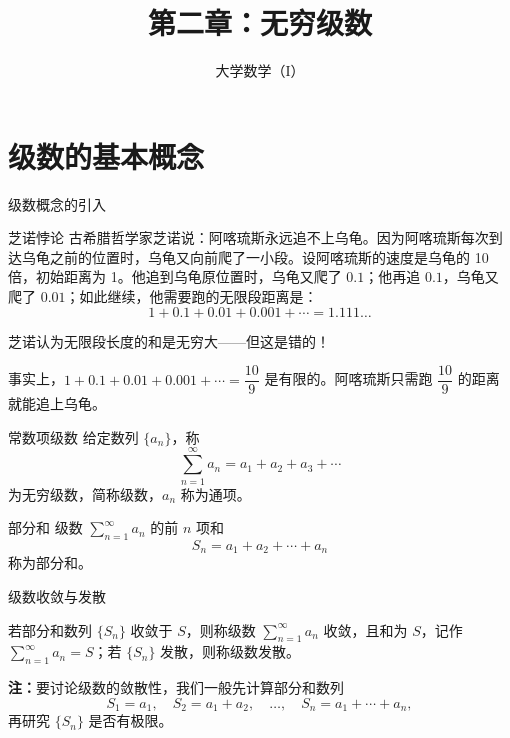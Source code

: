 \documentclass[aspectratio=169,10pt]{ctexbeamer}
\title[第二章：无穷级数]{第二章：无穷级数}
\author[大学数学（I）]{大学数学（I）}
\begin{document}
\begin{frame}[plain]
  \titlepage
\end{frame}






\section{级数的基本概念}



\begin{frame}{级数概念的引入}
	
	\begin{block}{芝诺悖论}
		古希腊哲学家芝诺说：阿喀琉斯永远追不上乌龟。因为阿喀琉斯每次到达乌龟之前的位置时，乌龟又向前爬了一小段。设阿喀琉斯的速度是乌龟的 10 倍，初始距离为 1。他追到乌龟原位置时，乌龟又爬了 \(0.1\)；他再追 \(0.1\)，乌龟又爬了 \(0.01\)；如此继续，他需要跑的无限段距离是：
		\[
		1 + 0.1 + 0.01 + 0.001 + \cdots = 1.111\ldots
		\]
		\vspace{0.5cm}
		
		芝诺认为无限段长度的和是无穷大——但这是错的！
		\vspace{0.5cm}
		
		事实上，\(1 + 0.1 + 0.01 + 0.001 + \cdots = \dfrac{10}{9}\) 是有限的。阿喀琉斯只需跑 \(\dfrac{10}{9}\) 的距离就能追上乌龟。
	\end{block}

\end{frame}

\begin{frame}
	\begin{block}{常数项级数}
		给定数列 \(\{a_n\}\)，称
		\[
		\sum_{n=1}^{\infty} a_n = a_1 + a_2 + a_3 + \cdots
		\]
		为无穷级数，简称级数，\(a_n\) 称为通项。
	\end{block}
	\vspace{0.8cm}
	\begin{block}{部分和}
		级数 \(\sum\limits_{n = 1}^{  \infty }  a_n\) 的前 \(n\) 项和
		\[
		S_n = a_1 + a_2 + \cdots + a_n
		\]
		称为部分和。
	\end{block}
	
\end{frame}

\begin{frame}{级数收敛与发散}
	\begin{block}{}
		若部分和数列 \(\{S_n\}\) 收敛于 \(S\)，则称级数 \(\sum\limits_{n = 1}^{  \infty } a_n\) 收敛，且和为 \(S\)，记作 \(\sum\limits_{n = 1}^{  \infty } a_n = S\)；若 \(\{S_n\}\) 发散，则称级数发散。
	\end{block}
	
	\vspace{0.8cm}
	\textbf{注：}要讨论级数的敛散性，我们一般先计算部分和数列
	\[
	S_1=a_1,\quad S_2=a_1+a_2,\quad \ldots,\quad S_n=a_1+\cdots+a_n,
	\]
	再研究 $\{S_n\}$ 是否有极限。
\end{frame}
\end{document}
